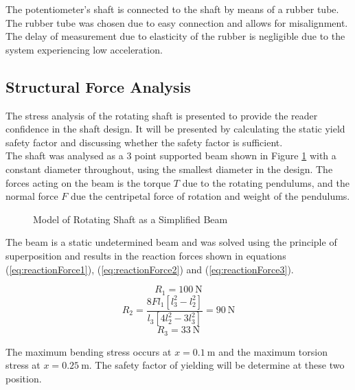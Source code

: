 The potentiometer's shaft is connected to the shaft by means of a rubber tube. The rubber tube was chosen due to easy connection and allows for misalignment. The delay of measurement due to elasticity of the rubber is negligible due to the system experiencing low acceleration. \\


\subsection{Structural Force Analysis}
The stress analysis of the rotating shaft is presented to provide the reader confidence in the shaft design. It will be presented by calculating the static yield safety factor and discussing whether the safety factor is sufficient.\\

The shaft was analysed as a 3 point supported beam shown in Figure \ref{fig:supp_beam} with a constant diameter throughout, using the smallest diameter in the design. The forces acting on the beam is the torque $T$ due to the rotating pendulums, and the normal force $F$ due the centripetal force of rotation and weight of the pendulums.\\


\begin{figure}[h]
	\centering
	
	\caption{Model of Rotating Shaft as a Simplified Beam}
	\label{fig:supp_beam}
\end{figure}

The beam is a static undetermined beam and was solved using the principle of superposition and results in the reaction forces shown in equations (\ref{eq:reactionForce1}), (\ref{eq:reactionForce2}) and (\ref{eq:reactionForce3}).

\begin{equation} \label{eq:reactionForce1}
R_{1} = \SI{100}{\newton}
\end{equation}
\begin{equation} \label{eq:reactionForce2}
R_{2} = \frac{ 8Fl_{1}[l_{3}^2 - l_{2}^2] }{l_{3}[4l_{2}^2-3l_{3}^2] } = \SI{90}{\newton}
\end{equation}
\begin{equation} \label{eq:reactionForce3}
R_{3} = \SI{33}{\newton}
\end{equation}

The maximum bending stress occurs at $x=\SI{0.1}{\meter}$ and the maximum torsion stress at $x=\SI{0.25}{\meter}$. The safety factor of yielding will be determine at these two position.\\

